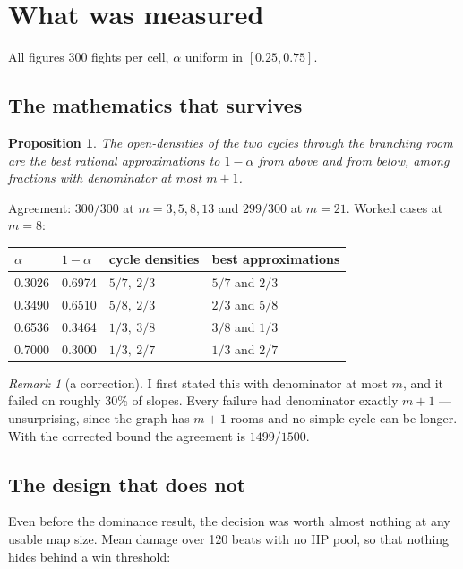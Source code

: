 \documentclass[11pt,a4paper]{article}
\theoremstyle{definition}
\theoremstyle{plain}
\newtheorem{proposition}[definition]{Proposition}
\theoremstyle{remark}
\newtheorem*{remark}{Remark}
\begin{document}
\section{What was measured}

All figures 300 fights per cell, $\alpha$ uniform in $[0.25, 0.75]$.

\subsection{The mathematics that survives}

\begin{proposition}\label{prop:conv}
The open-densities of the two cycles through the branching room are the best
rational approximations to $1 - \alpha$ from above and from below, among
fractions with denominator at most $m+1$.
\end{proposition}

Agreement: $300/300$ at $m = 3, 5, 8, 13$ and $299/300$ at $m = 21$. Worked
cases at $m = 8$:

\begin{center}
\begin{tabular}{llll}
\toprule
$\alpha$ & $1-\alpha$ & cycle densities & best approximations \\
\midrule
0.3026 & 0.6974 & $5/7,\ 2/3$ & $5/7$ and $2/3$ \\
0.3490 & 0.6510 & $5/8,\ 2/3$ & $2/3$ and $5/8$ \\
0.6536 & 0.3464 & $1/3,\ 3/8$ & $3/8$ and $1/3$ \\
0.7000 & 0.3000 & $1/3,\ 2/7$ & $1/3$ and $2/7$ \\
\bottomrule
\end{tabular}
\end{center}

\begin{remark}[a correction]
I first stated this with denominator at most $m$, and it failed on roughly 30\%
of slopes. Every failure had denominator exactly $m+1$ --- unsurprising, since
the graph has $m+1$ rooms and no simple cycle can be longer. With the corrected
bound the agreement is $1499/1500$.
\end{remark}

\subsection{The design that does not}

Even before the dominance result, the decision was worth almost nothing at any
usable map size. Mean damage over 120 beats with no HP pool, so that nothing
hides behind a win threshold:
\end{document}
